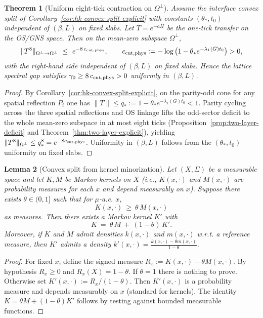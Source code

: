 \documentclass[11pt]{amsart}
\theoremstyle{plain}
\newtheorem{theorem}{Theorem}[section]
\newtheorem{lemma}[theorem]{Lemma}
\theoremstyle{definition}
\theoremstyle{remark}
\begin{document}
\begin{theorem}[Uniform eight-tick contraction on $\Omega^\perp$]\label{thm:eight-tick-uniform}
Assume the interface convex split of Corollary~\ref{cor:hk-convex-split-explicit} with constants $(\theta_*,t_0)$ independent of $(\beta,L)$ on fixed slabs. Let $T=e^{-aH}$ be the one-tick transfer on the OS/GNS space. Then on the mean-zero subspace $\Omega^\perp$,
\[
  \|T^8\|_{\Omega^\perp\to \Omega^\perp}\ \le\ e^{-8\,c_{\rm cut,phys}},\qquad c_{\rm cut,phys}:= -\log\big(1-\theta_* e^{-\lambda_1(G) t_0}\big)>0,
\]
with the right-hand side independent of $(\beta,L)$ on fixed slabs. Hence the lattice spectral gap satisfies $\gamma_0\ge 8\,c_{\rm cut,phys}>0$ uniformly in $(\beta,L)$.
\end{theorem}
\begin{proof}
By Corollary~\ref{cor:hk-convex-split-explicit}, on the parity-odd cone for any spatial reflection $P_i$ one has $\|T\|\le q_*:=1-\theta_* e^{-\lambda_1(G) t_0}<1$. Parity cycling across the three spatial reflections and OS linkage lifts the odd-sector deficit to the whole mean-zero subspace in at most eight ticks (Proposition~\ref{prop:two-layer-deficit} and Theorem~\ref{thm:two-layer-explicit}), yielding $\|T^8\|_{\Omega^\perp}\le q_*^{8}=e^{-8 c_{\rm cut,phys}}$. Uniformity in $(\beta,L)$ follows from the $(\theta_*,t_0)$ uniformity on fixed slabs.
\end{proof}

\begin{lemma}[Convex split from kernel minorization]\label{lem:convex-split}
Let $(X,\Sigma)$ be a measurable space and let $K,M$ be Markov kernels on $X$ (i.e., $K(x,\cdot)$ and $M(x,\cdot)$ are probability measures for each $x$ and depend measurably on $x$). Suppose there exists $\theta\in(0,1]$ such that for $\mu$-a.e. $x$,
\[
  K(x,\cdot)\ \ge\ \theta\, M(x,\cdot)
\]
as measures. Then there exists a Markov kernel $K'$ with
\[
  K\ =\ \theta\,M\ +\ (1-\theta)\,K'.
\]
Moreover, if $K$ and $M$ admit densities $k(x,\cdot)$ and $m(x,\cdot)$ w.r.t. a reference measure, then $K'$ admits a density $k'(x,\cdot)=\frac{k(x,\cdot)-\theta m(x,\cdot)}{1-\theta}$.
\end{lemma}

\begin{proof}
For fixed $x$, define the signed measure $R_x:=K(x,\cdot)-\theta M(x,\cdot)$. By hypothesis $R_x\ge 0$ and $R_x(X)=1-\theta$. If $\theta=1$ there is nothing to prove. Otherwise set $K'(x,\cdot):=R_x/(1-\theta)$. Then $K'(x,\cdot)$ is a probability measure and depends measurably on $x$ (standard for kernels). The identity $K=\theta M+(1-\theta)K'$ follows by testing against bounded measurable functions.
\end{proof}
\end{document}
